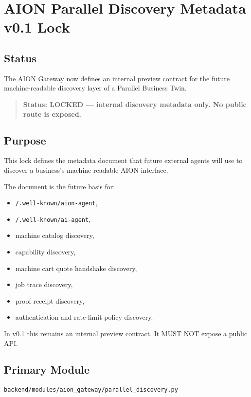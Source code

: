 \section{AION Parallel Discovery Metadata v0.1 Lock}
\label{sec:aion-parallel-discovery-metadata-lock}

\subsection{Status}

The AION Gateway now defines an internal preview contract for the future machine-readable discovery layer of a Parallel Business Twin.

\begin{quote}
\textbf{Status: LOCKED --- internal discovery metadata only. No public route is exposed.}
\end{quote}

\subsection{Purpose}

This lock defines the metadata document that future external agents will use to discover a business's machine-readable AION interface.

The document is the future basis for:

\begin{itemize}
  \item \texttt{/.well-known/aion-agent},
  \item \texttt{/.well-known/ai-agent},
  \item machine catalog discovery,
  \item capability discovery,
  \item machine cart quote handshake discovery,
  \item job trace discovery,
  \item proof receipt discovery,
  \item authentication and rate-limit policy discovery.
\end{itemize}

In v0.1 this remains an internal preview contract. It MUST NOT expose a public API.

\subsection{Primary Module}

\begin{verbatim}
backend/modules/aion_gateway/parallel_discovery.py
\end{verbatim}

